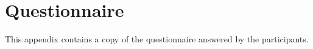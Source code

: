 \chapter{Questionnaire}
\label{questionnaire}
This appendix contains a copy of the questionnaire answered by the participants. 

